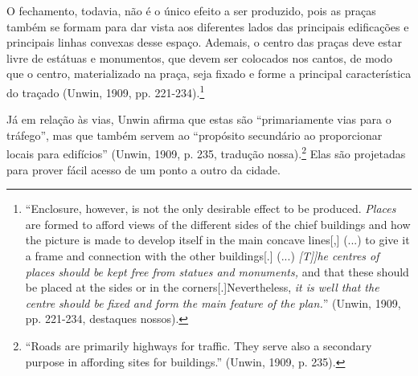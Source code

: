 \documentclass[12pt, a4paper]{book} %
\begin{document}
        O fechamento, todavia, não é o único efeito a ser produzido, pois as praças também se formam para dar vista aos diferentes lados das principais edificações e principais linhas convexas desse espaço. Ademais, o centro das praças deve estar livre de estátuas e monumentos, que devem ser colocados nos cantos, de modo que o centro, materializado na praça, seja fixado e forme a principal característica do traçado (Unwin, 1909, pp. 221-234).\footnote[78]{``Enclosure, however, is not the only desirable effect to be produced. \textit{Places} are formed to afford views of the different sides of the chief buildings and how the picture is made to develop itself in the main concave lines[,] (...) to give it a frame and connection with the other buildings[.] (...) \textit{[T]]he centres of places should be kept free from statues and monuments,} and that these should be placed at the sides or in the corners[.]Nevertheless, \textit{it is well that the centre should be fixed and form the main feature of the plan.}'' (Unwin, 1909, pp. 221-234, destaques nossos).}

        Já em relação às vias, Unwin afirma que estas são ``primariamente vias para o tráfego'', mas que também servem ao ``propósito secundário ao proporcionar locais para edifícios'' (Unwin, 1909, p. 235, tradução nossa).\footnote[79]{``Roads are primarily highways for traffic. They serve also a secondary purpose in affording sites for buildings.'' (Unwin, 1909, p. 235).} Elas são projetadas para prover fácil acesso de um ponto a outro da cidade.
\end{document}
